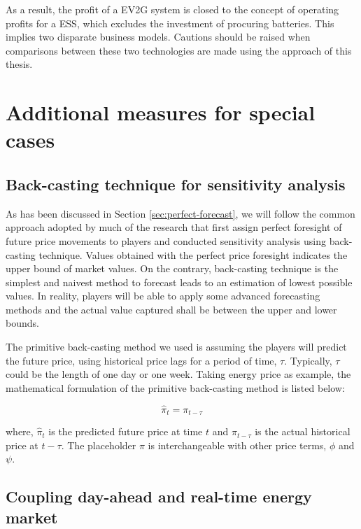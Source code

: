 As a result, the profit of a EV2G system is closed to the concept of operating profits for a ESS, which excludes the investment of procuring batteries. This implies two disparate business models. Cautions should be raised when comparisons between these two technologies are made using the approach of this thesis.

\section{Additional measures for special cases}
\label{sec:special}

\subsection{Back-casting technique for sensitivity analysis}

As has been discussed in Section \ref{sec:perfect-forecast}, we will follow the common approach adopted by much of the research that first assign perfect foresight of future price movements to players and conducted sensitivity analysis using back-casting technique. Values obtained with the perfect price foresight indicates the upper bound of market values. On the contrary, back-casting technique is the simplest and naivest method to forecast leads to an estimation of lowest possible values. In reality, players will be able to apply some advanced forecasting methods and the actual value captured shall be between the upper and lower bounds. 

The primitive back-casting method we used is assuming the players will predict the future price, using historical price lags for a period of time, $\tau$. Typically, $\tau$ could be the length of one day or one week. Taking energy price as example, the mathematical formulation of the primitive back-casting method is listed below:

\begin{equation*}
\hat{\pi}_t = \pi_{t-\tau}
\end{equation*}

where, $\hat{\pi}_t$ is the predicted future price at time $t$ and $\pi_{t-\tau}$ is the actual historical price at $t-\tau$. The placeholder $\pi$ is interchangeable with other price terms, $\phi$ and $\psi$.

\subsection{Coupling day-ahead and real-time energy market}

